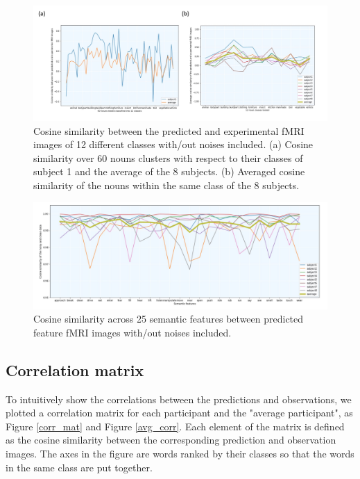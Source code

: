 \documentclass{article}
\begin{document}
\begin{figure}
\centering
\includegraphics[scale=0.2]{noisy_data_1.jpeg}
\caption{Cosine similarity between the predicted and experimental fMRI images of 12 different classes with/out noises included. (a) Cosine similarity over 60 nouns clusters with respect to their classes of subject 1 and the average of the 8 subjects. (b) Averaged cosine similarity of the nouns within the same class of the 8 subjects.}
\label{noisy_data_1}
\end{figure}

\begin{figure}
\centering
\includegraphics[scale=0.2]{noisy_data_2.jpeg}
\caption{Cosine similarity across 25 semantic features between predicted feature fMRI images with/out noises included.}
\label{noisy_data_2}
\end{figure}

\subsection{Correlation matrix}

To intuitively show the correlations between the predictions and observations, we plotted a correlation matrix for each participant and the "average participant", as Figure \ref{corr_mat} and Figure \ref{avg_corr}. Each element of the matrix is defined as the cosine similarity between the corresponding prediction and observation images. The axes in the figure are words ranked by their classes so that the words in the same class are put together.
\end{document}
